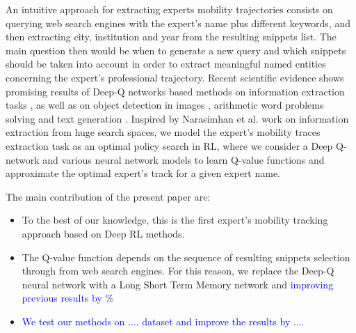 \documentclass[11pt,a4paper]{article}
\newcommand{\PA}[1]{{\textcolor{blue}{#1}}}
\begin{document}
An intuitive approach for extracting experts mobility trajectories consists on querying web search engines with the expert's name plus different keywords, and then extracting city, institution and year from the resulting snippets list. The main question then would be when to generate a new query and which snippets should be taken into account in order to extract meaningful named entities concerning the expert's professional trajectory. Recent scientific evidence shows promising results of Deep-Q networks based methods on information extraction tasks \citep{narasimhan2016improving}, as well as on object detection in images \cite{Caicedo2015}, arithmetic word problems solving \cite{wang2018} and text generation \citep{Guo2015}. Inspired by Narasimhan et al.  work on information extraction from huge search spaces, we model the expert's mobility traces extraction task as an optimal policy search in RL, where we consider a Deep Q-network and various neural network models to learn Q-value functions and approximate the optimal expert's track for a given expert name.  

The main contribution of the present paper are:
\begin{itemize}
\item To the best of our knowledge, this is the first expert's mobility tracking approach based on  Deep RL methods. 
\item The Q-value function depends on the sequence of resulting snippets selection through from web search engines. For this reason, we replace the Deep-Q neural network \cite{mnih2015} with a Long Short Term Memory {\smallLSTM} network and \PA{improving previous results by \%  }
\item \PA{We test our methods on .... dataset and improve the results by .... }
\end{itemize}

\end{document}
